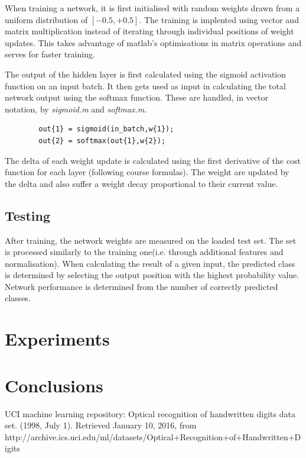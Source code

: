 \documentclass[11]{article}
\begin{document}
When training a network, it is first initialised with random weights drawn from a uniform distribution of $[-0.5,+0.5]$. The training is implented using vector and matrix multiplication instead of iterating through individual positions of weight updates. This takes advantage of matlab's optimisations in matrix operations and serves for faster training. 

The output of the hidden layer is first calculated using the sigmoid activation function on an input batch. It then gets used as input in calculating the total network output using the softmax function. These are handled, in vector notation, by \emph{sigmoid.m} and \emph{softmax.m}.
\begin{lstlisting}
        out{1} = sigmoid(in_batch,w{1});
        out{2} = softmax(out{1},w{2});
\end{lstlisting}

The delta of each weight update is calculated using the first derivative of the cost function for each layer (following course formulas). The weight are updated by the delta and also suffer a weight decay proportional to their current value. 

\subsection{Testing}

After training, the network weights are measured on the loaded test set. The set is processed similarly to the training one(i.e. through additional features and normalisation). When calculating the result of a given input, the predicted class is determined by selecting the output position with the highest probability value. Network performance is determined from the number of correctly predicted classes. 

\section{Experiments}
\section{Conclusions}

\begin{thebibliography}{9}
UCI machine learning repository: Optical recognition of handwritten digits data set. (1998, July 1). Retrieved January 10, 2016, from http://archive.ics.uci.edu/ml/datasets/Optical+Recognition+of+Handwritten+Digits

\end{thebibliography}
\end{document}
